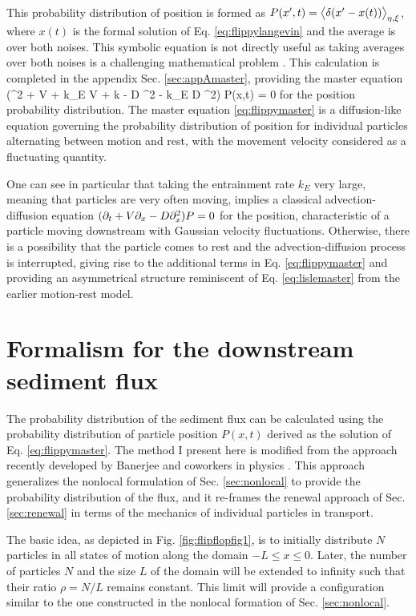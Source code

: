 This probability distribution of position is formed as $ P(x',t) = \big\langle \delta(x'-x(t))\big\rangle_{\eta,\xi} $, where $x(t)$ is the formal solution of Eq. \ref{eq:flippylangevin} and the average is over both noises.
This symbolic equation is not directly useful as taking averages over both noises is a challenging mathematical problem \citep[e.g.][]{Hanggi1978}. This calculation is completed in the appendix Sec. \ref{sec:appAmaster}, providing the master equation
\be (\pt^2 + V \px \pt + k_E V \px + k \pt - D \px^2 \pt - k_E D \px^2) P(x,t) = 0 \label{eq:flippymaster}\ee
for the position probability distribution.
The master equation \ref{eq:flippymaster} is a diffusion-like equation governing the probability distribution of position for individual particles alternating between motion and rest, with the movement velocity considered as a fluctuating quantity.

One can see in particular that taking the entrainment rate $k_E$ very large, meaning that particles are very often moving, implies a classical advection-diffusion equation $(\partial_t + V\partial_x -D \partial_x^2)P=0$ for the position, characteristic of a particle moving downstream with Gaussian velocity fluctuations. Otherwise, there is a possibility that the particle comes to rest and the advection-diffusion process is interrupted, giving rise to the additional terms in Eq. \ref{eq:flippymaster} and providing an asymmetrical structure reminiscent of Eq. \ref{eq:lislemaster} from the earlier motion-rest model.

\section{Formalism for the downstream sediment flux}
\label{sec:flippyflux}

The probability distribution of the sediment flux can be calculated using the probability distribution of particle position $P(x,t)$ derived as the solution of Eq. \ref{eq:flippymaster}.
The method I present here is modified from the approach recently developed by Banerjee and coworkers in physics \citep{Banerjee2020}.
This approach generalizes the nonlocal formulation of Sec. \ref{sec:nonlocal} to provide the probability distribution of the flux, and it re-frames the renewal approach of Sec. \ref{sec:renewal} in terms of the mechanics of individual particles in transport.

The basic idea, as depicted in Fig. \ref{fig:flipflopfig1}, is to initially distribute $N$ particles in all states of motion along the domain $-L\leq x\leq 0$.
Later, the number of particles $N$ and the size $L$ of the domain will be extended to infinity such that their ratio $\rho=N/L$ remains constant.
This limit will provide a configuration similar to the one constructed in the nonlocal formation of Sec. \ref{sec:nonlocal}.

